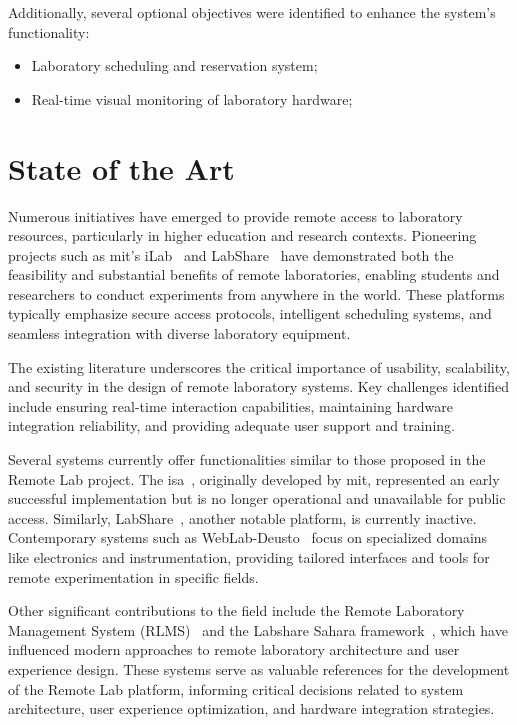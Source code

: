 Additionally, several optional objectives were identified to enhance the system's functionality:
\begin{itemize}
\item Laboratory scheduling and reservation system;
\item Real-time visual monitoring of laboratory hardware;
\end{itemize}

\section{State of the Art}\label{sec:state_of_art}
Numerous initiatives have emerged to provide remote access to laboratory resources, particularly in higher education and research contexts. Pioneering projects such as \acs{mit}'s iLab~\cite{ilab} and LabShare~\cite{labshare} have demonstrated both the feasibility and substantial benefits of remote laboratories, enabling students and researchers to conduct experiments from anywhere in the world. These platforms typically emphasize secure access protocols, intelligent scheduling systems, and seamless integration with diverse laboratory equipment.

The existing literature underscores the critical importance of usability, scalability, and security in the design of remote laboratory systems. Key challenges identified include ensuring real-time interaction capabilities, maintaining hardware integration reliability, and providing adequate user support and training.

Several systems currently offer functionalities similar to those proposed in the Remote Lab project. The \acs{isa}~\cite{ilab}, originally developed by \acs{mit}, represented an early successful implementation but is no longer operational and unavailable for public access. Similarly, LabShare~\cite{labshare}, another notable platform, is currently inactive. Contemporary systems such as WebLab-Deusto~\cite{weblabdeusto} focus on specialized domains like electronics and instrumentation, providing tailored interfaces and tools for remote experimentation in specific fields.

Other significant contributions to the field include the Remote Laboratory Management System (RLMS)~\cite{rlms} and the Labshare Sahara framework~\cite{sahara}, which have influenced modern approaches to remote laboratory architecture and user experience design. These systems serve as valuable references for the development of the Remote Lab platform, informing critical decisions related to system architecture, user experience optimization, and hardware integration strategies.

